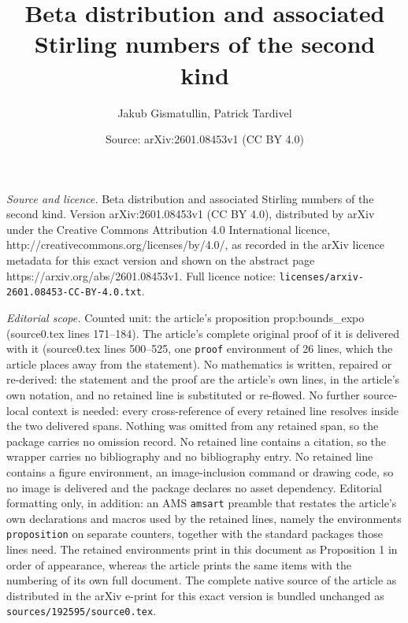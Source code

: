 \documentclass[10pt,a4paper]{amsart}
\title{Beta distribution and associated Stirling numbers of the second kind}
\author{Jakub Gismatullin, Patrick Tardivel}
\date{Source: arXiv:2601.08453v1 (CC BY 4.0)}
\begin{document}
\maketitle

\noindent\emph{Source and licence.} Beta distribution and associated Stirling numbers of the second kind. Version arXiv:2601.08453v1 (CC BY 4.0), distributed by arXiv under the Creative Commons Attribution 4.0 International licence, http://creativecommons.org/licenses/by/4.0/, as recorded in the arXiv licence metadata for this exact version and shown on the abstract page https://arxiv.org/abs/2601.08453v1. Full licence notice: \texttt{licenses/arxiv-2601.08453-CC-BY-4.0.txt}.\par\smallskip

\noindent\textit{Editorial scope.} Counted unit: the article's proposition prop:bounds\_expo (source0.tex lines 171--184). The article's complete original proof of it is delivered with it (source0.tex lines 500--525, one \texttt{proof} environment of 26 lines, which the article places away from the statement). No mathematics is written, repaired or re-derived: the statement and the proof are the article's own lines, in the article's own notation, and no retained line is substituted or re-flowed.  No further source-local context is needed: every cross-reference of every retained line resolves inside the two delivered spans.  Nothing was omitted from any retained span, so the package carries no omission record.  No retained line contains a citation, so the wrapper carries no bibliography and no bibliography entry.  No retained line contains a figure environment, an image-inclusion command or drawing code, so no image is delivered and the package declares no asset dependency.  Editorial formatting only, in addition: an AMS \texttt{amsart} preamble that restates the article's own declarations and macros used by the retained lines, namely the environments \texttt{proposition} on separate counters, together with the standard packages those lines need.  The retained environments print in this document as Proposition 1 in order of appearance, whereas the article prints the same items with the numbering of its own full document.  The complete native source of the article as distributed in the arXiv e-print for this exact version is bundled unchanged as \texttt{sources/192595/source0.tex}.
\end{document}
